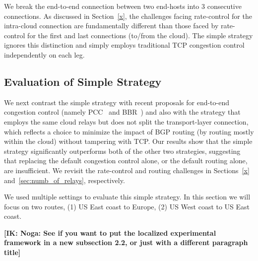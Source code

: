 \documentclass[sigconf,usenames,dvipsnames,geometry]{acmart}
\newcommand{\mycomm}[3]{{\color{#2} \textbf{[#1: #3]}}}
\newcommand{\mycomm}[3]{}
\newcommand{\IK}[1]{\mycomm{IK}{blue}{#1}}
\begin{document}
\vspace{0.1in} We break the end-to-end connection between two end-hosts into $3$ consecutive connections. As discussed in Section~\ref{x}, the challenges facing rate-control for the intra-cloud connection are fundamentally different than those faced by rate-control for the first and last connections (to/from the cloud). The simple strategy ignores this distinction and simply employs traditional TCP congestion control independently on each leg.

\subsection{Evaluation of Simple Strategy}

We next contrast the simple strategy with recent proposals for end-to-end congestion control (namely PCC~\cite{PCC} and BBR~\cite{BBR}) and also with the strategy that employs the same cloud relays but does not split the transport-layer connection, which reflects a choice to minimize the impact of BGP routing (by routing mostly within the cloud) without tampering with TCP. Our results show that the simple strategy significantly outperforms both of the other two strategies, suggesting that replacing the default congestion control alone, or the default routing alone, are insufficient. We revisit the rate-control and routing challenges in Sections~\ref{x} and~\ref{sec:numb_of_relays}, respectively.

\vspace{0.1in} We used multiple settings to evaluate this simple strategy. In this section we will focus on two routes, (1) US East coast to Europe, (2) US West coast to US East coast.

\vspace{0.1in}

\vspace{0.1in}

\IK{Noga: See if you want to put the localized experimental framework in a new subsection 2.2, or just with a different paragraph title}


\end{document}
